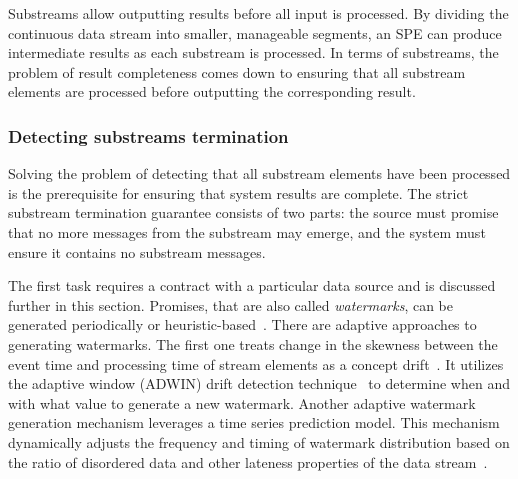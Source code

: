 Substreams allow outputting results before all input is processed. By dividing the continuous data stream into smaller, manageable segments, an SPE can produce intermediate results as each substream is processed. In terms of substreams, the problem of result completeness comes down to ensuring that all substream elements are processed before outputting the corresponding result. 

\subsubsection{Detecting substreams termination}

Solving the problem of detecting that all substream elements have been processed is the prerequisite for ensuring that system results are complete. The strict substream termination guarantee consists of two parts: the source must promise that no more messages from the substream may emerge, and the system must ensure it contains no substream messages. 

The first task requires a contract with a particular data source and is discussed further in this section. Promises, that are also called {\em watermarks}, can be generated periodically or heuristic-based~\cite{Akidau:2013:MFS:2536222.2536229, akidau2015streaming}. There are adaptive approaches to generating watermarks. The first one treats change in the skewness between the event time and processing time of stream elements as a concept drift~\cite{awad2019adaptive}. It utilizes the adaptive window (ADWIN) drift detection technique~\cite{bifet2007learning, grulich2018scalable} to determine when and with what value to generate a new watermark. Another adaptive watermark generation mechanism leverages a time series prediction model. This mechanism dynamically adjusts the frequency and timing of watermark distribution based on the ratio of disordered data and other lateness properties of the data stream~\cite{song2021adaptive}.


